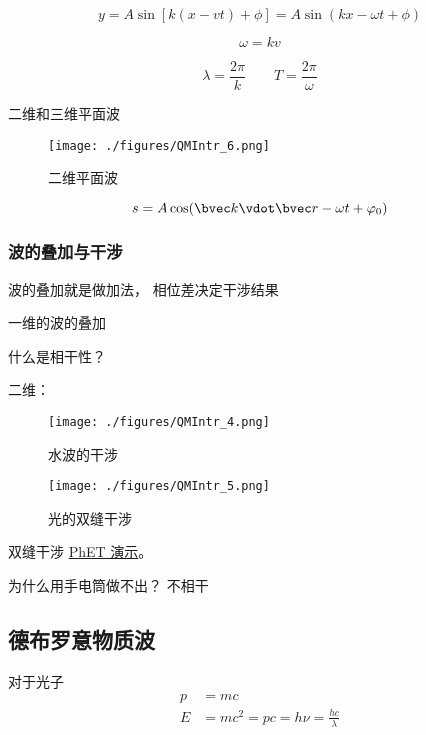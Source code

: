 \begin{equation}
y = A \sin[k(x-vt) + \phi] = A \sin(kx - \omega t + \phi)
\end{equation}

\begin{equation}
\omega = kv
\end{equation}

\begin{equation}
\lambda = \frac{2\pi}{k}
\qquad
T = \frac{2\pi}{\omega}
\end{equation}

二维和三维平面波

\begin{figure}[ht]
\centering
\texttt{[image: ./figures/QMIntr\_6.png]}
\caption{二维平面波} \label{QMIntr_fig6}
\end{figure}

\begin{equation}
s = A \cos(\bvec k \vdot \bvec r - \omega t + \varphi_0)
\end{equation}


\subsubsection{波的叠加与干涉}

波的叠加就是做加法， 相位差决定干涉结果

一维的波的叠加

什么是相干性？

二维：

\begin{figure}[ht]
\centering
\texttt{[image: ./figures/QMIntr\_4.png]}
\caption{水波的干涉} \label{QMIntr_fig4}
\end{figure}

\begin{figure}[ht]
\centering
\texttt{[image: ./figures/QMIntr\_5.png]}
\caption{光的双缝干涉} \label{QMIntr_fig5}
\end{figure}

双缝干涉 \href{https://phet.colorado.edu/sims/html/wave-interference/latest/wave-interference_en.html}{PhET 演示}。

为什么用手电筒做不出？ 不相干

\subsection{德布罗意物质波}

对于光子
\begin{equation}
\begin{aligned}
p &= mc
\\
E &= mc^2 = pc = h\nu = \frac{hc}{\lambda}
\end{aligned}
\end{equation}

